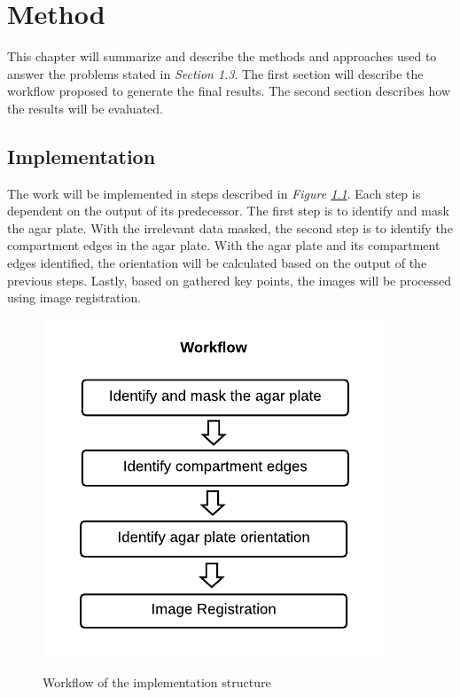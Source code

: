 

\chapter{Method}
This chapter will summarize and describe the methods and approaches used to answer the problems stated in \textit{Section 1.3}. The first section will describe the workflow proposed to generate the final results. The second section describes how the results will be evaluated.

\section{Implementation}
\noindent The work will be implemented in steps described in \textit{Figure \ref{fig:method workflow}}. Each step is dependent on the output of its predecessor. The first step is to identify and mask the agar plate. With the irrelevant data masked, the second step is to identify the compartment edges in the agar plate. With the agar plate and its compartment edges identified, the orientation will be calculated based on the output of the previous steps. Lastly, based on gathered key points, the images will be processed using image registration. \\

\begin{figure}[H]
    \centering
     \includegraphics[width=.43\linewidth]{figures/PDF/Workflow.pdf}\\
    \caption{Workflow of the implementation structure}
    \label{fig:method workflow}
\end{figure}

